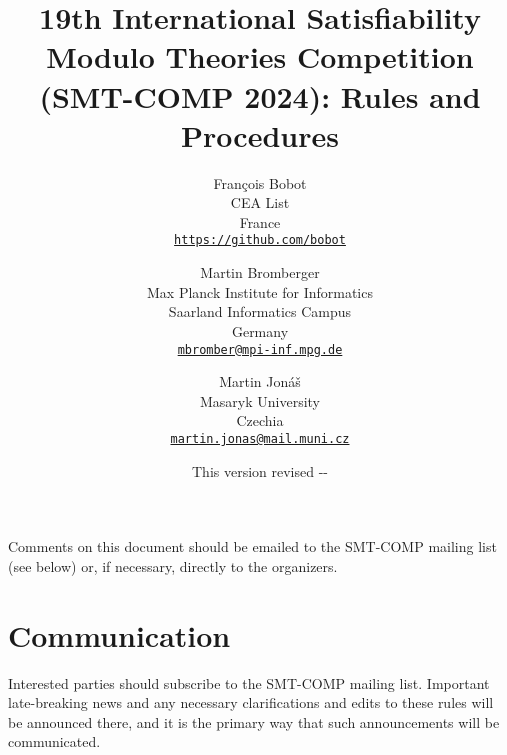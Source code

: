 \documentclass[12pt]{article}
\begin{document}
\date{\small This version revised \the\year-\the\month-\the\day}

\title{19th International Satisfiability Modulo Theories Competition
  (SMT-COMP 2024): Rules and Procedures}

\def\doauthor#1{{%
  \hsize.5\hsize \advance\hsize by-1cm %
  \def\\{\hss\egroup\hbox to\hsize\bgroup\strut\hss}%
  \vbox{\hbox to\hsize\bgroup\strut\hss#1\hss\egroup}}}%

\def\header#1{\medskip\noindent\textbf{#1}}

\author{%
Fran\c{c}ois Bobot\\
CEA List \\
France \\
{\small\href{mailto:Francois.BOBOT@cea.fr}{\texttt{https://github.com/bobot}}} \\
\and
Martin Bromberger\\
Max Planck Institute for Informatics\\
Saarland Informatics Campus\\
Germany\\
{\small\href{mailto:mbromber@mpi-inf.mpg.de}{\texttt{mbromber@mpi-inf.mpg.de}}}\\
\and
Martin Jon\'{a}\v{s}\\
Masaryk University\\
Czechia\\
{\small\href{mailto:martin.jonas@mail.muni.cz}{\texttt{martin.jonas@mail.muni.cz}}}
}

\maketitle

\noindent Comments on this document should be emailed to the SMT-COMP
mailing list (see below) or, if necessary, directly to the organizers.


\section{Communication}

Interested parties should subscribe to the SMT-COMP mailing list.
Important late-breaking news and any necessary clarifications and
edits to these rules will be announced there, and it is the primary
way that such announcements will be communicated.
\end{document}
